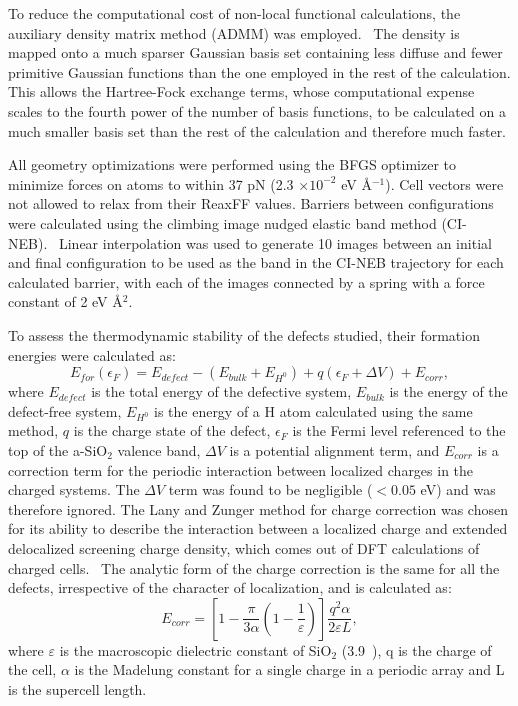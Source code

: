 \documentclass[aps,prb,reprint,superscriptaddress,showpacs]{revtex4-1}
\begin{document}
To reduce the computational cost of non-local functional calculations, the auxiliary density matrix method (ADMM) was employed.~\cite{admm} The density is mapped onto a much sparser Gaussian basis set containing less diffuse and fewer primitive Gaussian functions than the one employed in the rest of the calculation. This allows the Hartree-Fock exchange terms, whose computational expense scales to the fourth power of the number of basis functions, to be calculated on a much smaller basis set than the rest of the calculation and therefore much faster. 

All geometry optimizations were performed using the BFGS optimizer to minimize forces on atoms to within 37 pN (2.3 $\times 10^{-2}$ eV {\AA}$^{-1}$). Cell vectors were not allowed to relax from their ReaxFF values. Barriers between configurations were calculated using the climbing image nudged elastic band method (CI-NEB).~\cite{neb1,neb2} Linear interpolation was used to generate 10 images between an initial and final configuration to be used as the band in the CI-NEB trajectory for each calculated barrier, with each of the images connected by a spring with a force constant of 2 eV {\AA}$^2$.

To assess the thermodynamic stability of the defects studied, their formation energies were calculated as:
\begin{equation}
E_{for}(\epsilon_F)=E_{defect}-(E_{bulk}+E_{H^0})+q(\epsilon_F + \Delta V) + E_{corr},
\label{eq:formation_fermi}
\end{equation}
where $E_{defect}$ is the total energy of the defective system, $E_{bulk}$ is the energy of the defect-free system, $E_{H^0}$ is the energy of a H atom calculated using the same method, $q$ is the charge state of the defect, $\epsilon_F$ is the Fermi level referenced to the top of the a-SiO$_2$ valence band, $\Delta V$ is a potential alignment term, and $E_{corr}$ is a correction term for the periodic interaction between localized charges in the charged systems. The $\Delta V$ term was found to be negligible ($< 0.05$ eV) and was therefore ignored. The Lany and Zunger method for charge correction was chosen for its ability to describe the interaction between a localized charge and extended delocalized screening charge density, which comes out of DFT calculations of charged cells.~\cite{lany_zunger,finite_size} The analytic form of the charge correction is the same for all the defects, irrespective of the character of localization, and is calculated as:
\begin{equation}
E_{corr}=\left [ 1 - \frac{\pi}{3 \alpha}\left (1-\frac{1}{\varepsilon}\right)\right ]\frac{q^2\alpha}{2 \varepsilon L},
\label{eq:ecorr}
\end{equation}
where $\varepsilon$ is the macroscopic dielectric constant of SiO$_2$ (3.9~\cite{sio2_dielectric}), q is the charge of the cell, $\alpha$ is the Madelung constant for a single charge in a periodic array and L is the supercell length. 
\end{document}
